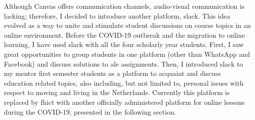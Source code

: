 Although Canvas offers communication channels, audio-visual communication is lacking; therefore, I decided to introduce another platform, \Gls{slack}. 
This idea evolved as a way to unite and stimulate student discussions on course topics in an online environment. 
Before the COVID-19 outbreak and the migration to online learning, I have used \Gls{slack} with all the four scholarly year students. First, I saw great opportunities to group students in one platform (other than WhatsApp and Facebook) and discuss solutions to \acrshort{ale} assignments. Then, I introduced \gls{slack} to my mentor first semester students as a platform to acquaint and discuss education related topics, also including, but not limited to, personal issues with respect to moving and living in the Netherlands. Currently this platform is replaced by \acrshort{fhict} with another officially administered platform for online lessons during the COVID-19, presented in the following section.  
